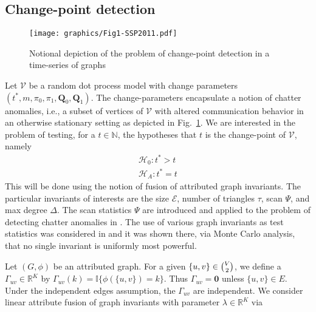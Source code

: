 \documentclass[10pt,journal,compsoc]{IEEEtran}
\theoremstyle{definition}
\begin{document}
\subsection{Change-point detection}
\begin{figure}[htbp]
  \centering
  \texttt{[image: graphics/Fig1-SSP2011.pdf]}
  \caption{Notional depiction of the problem of change-point detection
    in a time-series of graphs}
  \label{fig:notional_change_point}
\end{figure}
Let $\mathscr{V}$ be a random dot process model with change parameters
$(t^{*}, m, \pi_0, \pi_1, \mathbf{Q}_0, \mathbf{Q}_1)$. The
change-parameters encapsulate a notion of chatter anomalies, i.e., a
subset of vertices of $\mathscr{V}$ with altered communication
behavior in an otherwise stationary setting as depicted in
Fig.~\ref{fig:notional_change_point}. We are interested in the problem
of testing, for a $t \in \mathbb{N}$, the hypotheses that $t$ is the
change-point of $\mathscr{V}$, namely
\begin{gather*}
  \mathscr{H}_0 \colon t^{*} > t \\
  \mathscr{H}_A \colon t^{*} = t
\end{gather*}
This will be done using the notion of fusion of attributed graph
invariants. The particular invariants of interests are the size
$\mathcal{E}$, number of triangles $\tau$, scan $\Psi$, and max degree
$\Delta$. The scan statistics $\Psi$ are introduced and applied to the
problem of detecting chatter anomalies in
\cite{priebe05:_scan_statis_enron_graph}. The use of various graph
invariants as test statistics was considered in
\cite{pao11:_statis_infer_random_graph} and it was shown there, via
Monte Carlo analysis, that no single invariant is uniformly most
powerful.

Let $(G,\phi)$ be an attributed graph. For a given $\{u,v\}
\in \tbinom{V}{2}$, we define a $\Gamma_{uv} \in \mathbb{R}^{K}$ by
$\Gamma_{uv}(k) = \mathbb{I}\{\phi(\{u,v\}) = k\}$. Thus $\Gamma_{uv}
= \bm{0}$ unless $\{u,v\} \in E$. Under the independent edges
assumption, the $\Gamma_{uv}$ are independent. We consider linear
attribute fusion of graph invariants with parameter $\lambda \in
\mathbb{R}^{K}$ via
\end{document}
